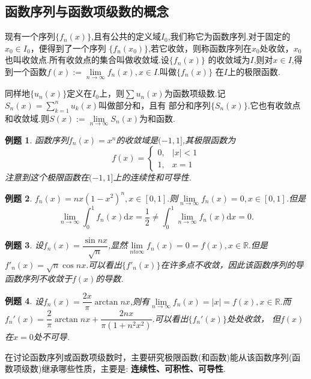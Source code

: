 \documentclass[UTF8]{article}
\newcommand{\R}{\mathbb{R}}
\newcommand{\dx}{\mathrm{d}x}
\newtheorem{exa}{\hspace{2em}例题}[section]
\begin{document}
\subsection{函数序列与函数项级数的概念}
现有一个序列$\{f_n(x)\}$,且有公共的定义域$I_0$,我们称它为函数序列.对于固定的$x_0\in I_0$，便得到了一个序列
$\{f_n(x_0)\}$,若它收敛，则称函数序列在$x_0$处收敛，$x_0$也叫收敛点.所有收敛点的集合叫做收敛域.设$\{f_n(x)\}$
的收敛域为$I$,则对$x\in I$,得到一个函数$f(x):=\lim\limits_{n\to\infty}f_n(x),x\in I.$叫做$\{f_n(x)\}$
在$I$上的极限函数.

同样地$\{u_n(x)\}$定义在$I_0$上，则$\sum u_n(x)$为函数项级数.记$S_n(x)=\sum\limits_{k=1}^nu_k(x)$叫做部分和，且有
部分和序列$\{S_n(x)\}$.它也有收敛点和收敛域.则$S(x):=\lim\limits_{n\to\infty} S_n(x)$为和函数.
\begin{exa}
  函数序列$f_n(x)=x^n$的收敛域是$(-1,1]$,其极限函数为
  $$f(x)=\begin{cases}0,&|x|<1\\1,&x=1\end{cases}$$
  注意到这个极限函数在$(-1,1]$上的连续性和可导性.
\end{exa}
\begin{exa}
  $f_n(x)=nx(1-x^2)^n,x\in[0,1].$则$\lim\limits_{n\to\infty}f_n(x)=0,x\in[0,1]$.但是
  $$\lim_{n\to\infty}\int_0^1f_n(x)\dx=\frac{1}{2}\ne\int_0^1\lim_{n\to\infty}f_n(x)\dx=0.$$
\end{exa}
\begin{exa}
  设$f_n(x)=\dfrac{\sin nx}{\sqrt{n}}$,显然$\lim\limits_{nto\infty}f_n(x)=0=f(x),x\in\R.$但是
  $f'_n(x)=\sqrt{n}\cos nx.$可以看出$\{f'_n(x)\}$在许多点不收敛，因此该函数序列的导函数序列不收敛于$f(x)$的导数.
\end{exa}
\begin{exa}
  设$f_n(x)=\dfrac{2x}{\pi}\arctan nx$,则有$\lim\limits_{n\to\infty}f_n(x)=|x|=f(x),x\in\R.$而
  $f_n'(x)=\dfrac{2}{\pi}\arctan nx+\dfrac{2nx}{\pi(1+n^2x^2)}.$可以看出$\{f_n'(x)\}$处处收敛，
  但$f(x)$在$x=0$处不可导.
\end{exa}
在讨论函数序列或函数项级数时，主要研究极限函数(和函数)能从该函数序列(函数项级数)继承哪些性质，主要是:
\textbf{连续性、可积性、可导性}.
\end{document}
